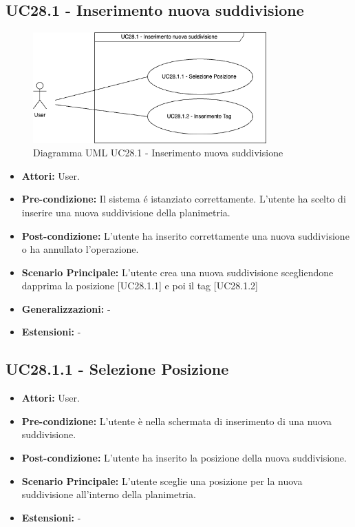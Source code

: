 \subsection{UC28.1 - Inserimento nuova suddivisione}
\begin{figure}[H]
  \centering
  \includegraphics[width=0.8\textwidth]{UC_diagrams_21-27/UC28.1.drawio.png}
  \caption{Diagramma UML UC28.1 - Inserimento nuova suddivisione}
\end{figure}
\begin{itemize}
    \item \textbf{Attori:} User.
    \item \textbf{Pre-condizione:}  Il sistema é istanziato correttamente. L'utente ha scelto di inserire una nuova suddivisione della planimetria.
    \item \textbf{Post-condizione:} L'utente ha inserito correttamente una nuova suddivisione o ha annullato l'operazione.
    \item \textbf{Scenario Principale:} L'utente crea una nuova suddivisione scegliendone dapprima la posizione [UC28.1.1] e poi il tag [UC28.1.2]
    \item \textbf{Generalizzazioni:} -
    \item \textbf{Estensioni:} -
\end{itemize}

\subsection{UC28.1.1 - Selezione Posizione}
\begin{itemize}
    \item \textbf{Attori:} User.
    \item \textbf{Pre-condizione:}  L'utente è nella schermata di inserimento di una nuova suddivisione.
    \item \textbf{Post-condizione:} L'utente ha inserito la posizione della nuova suddivisione.
    \item \textbf{Scenario Principale:} L'utente sceglie una posizione per la nuova suddivisione all'interno della planimetria.
    \item \textbf{Estensioni:} -
\end{itemize}

